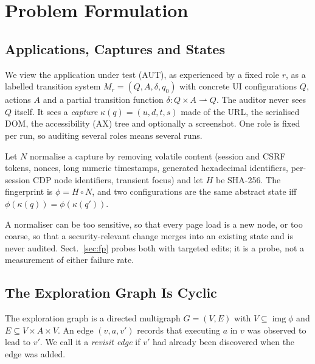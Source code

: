 \section{Problem Formulation}
\label{sec:model}

\subsection{Applications, Captures and States}

We view the application under test (AUT), as experienced by a fixed role $r$, as a
labelled transition system $M_r=(Q,A,\delta,q_0)$ with concrete UI configurations
$Q$, actions $A$ and a partial transition function $\delta:Q\times A\rightharpoonup
Q$. The auditor never sees $Q$ itself. It sees a \emph{capture}
$\kappa(q)=(u,d,t,s)$ made of the URL, the serialised DOM, the accessibility (AX)
tree and optionally a screenshot. One role is fixed per run, so auditing several
roles means several runs.

\begin{definition}
Let $N$ normalise a capture by removing volatile content (session and CSRF
tokens, nonces, long numeric timestamps, generated hexadecimal identifiers,
per-session CDP node identifiers, transient focus) and let $H$ be SHA-256. The
fingerprint is $\phi=H\circ N$, and two configurations are the same abstract state
iff $\phi(\kappa(q))=\phi(\kappa(q'))$.
\end{definition}

A normaliser can be too sensitive, so that every page load is a new node, or too
coarse, so that a security-relevant change merges into an existing state and is
never audited. Sect.~\ref{sec:fp} probes both with targeted edits; it is a probe,
not a measurement of either failure rate.

\subsection{The Exploration Graph Is Cyclic}

\begin{definition}
The exploration graph is a directed multigraph $G=(V,E)$ with $V\subseteq
\operatorname{img}\phi$ and $E\subseteq V\times A\times V$. An edge $(v,a,v')$
records that executing $a$ in $v$ was observed to lead to $v'$. We call it a
\emph{revisit edge} if $v'$ had already been discovered when the edge was added.
\end{definition}

